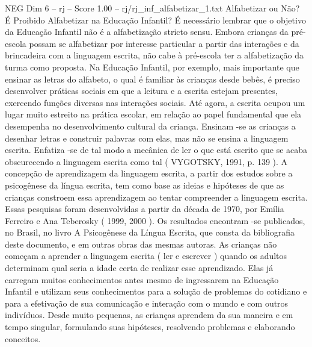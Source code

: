 \begin{textsample}{NEG Dim 6 – rj – Score 1.00 – rj/rj\_inf\_alfabetizar\_1.txt}  \label{ex:f6_neg_019}
Alfabetizar ou Não?
É Proibido Alfabetizar na Educação Infantil?
É necessário lembrar que o objetivo da Educação Infantil não é a alfabetização stricto sensu.
Embora crianças da pré-escola possam se alfabetizar por interesse particular a partir das interações e da brincadeira com a linguagem escrita, não cabe à pré-escola ter a alfabetização da turma como proposta.
Na Educação Infantil, por exemplo, mais importante que ensinar as letras do alfabeto, o qual é familiar às crianças desde bebês, é preciso desenvolver práticas sociais em que a leitura e a escrita estejam presentes, exercendo funções diversas nas interações sociais.
Até agora, a escrita ocupou um lugar muito estreito na prática escolar, em relação ao papel fundamental que ela desempenha no desenvolvimento cultural da criança.
Ensinam -se as crianças a desenhar letras e construir palavras com elas, mas não se ensina a linguagem escrita.
Enfatiza -se de tal modo a mecânica de ler o que está escrito que se acaba obscurecendo a linguagem escrita como tal ( VYGOTSKY, 1991, p. 139 ).
A concepção de aprendizagem da linguagem escrita, a partir dos estudos sobre a psicogênese da língua escrita, tem como base as ideias e hipóteses de que as crianças constroem essa aprendizagem ao tentar compreender a linguagem escrita.
Essas pesquisas foram desenvolvidas a partir da década de 1970, por Emília Ferreiro e Ana Teberosky ( 1999, 2000 ).
Os resultados encontram -se publicados, no Brasil, no livro A Psicogênese da Língua Escrita, que consta da bibliografia deste documento, e em outras obras das mesmas autoras.
As crianças não começam a aprender a linguagem escrita ( ler e escrever ) quando os adultos determinam qual seria a idade certa de realizar esse aprendizado.
Elas já carregam muitos conhecimentos antes mesmo de ingressarem na Educação Infantil e utilizam seus conhecimentos para a solução de problemas do cotidiano e para a efetivação de sua comunicação e interação com o mundo e com outros indivíduos.
Desde muito pequenas, as crianças aprendem da sua maneira e em tempo singular, formulando suas hipóteses, resolvendo problemas e elaborando conceitos.

\end{textsample}
